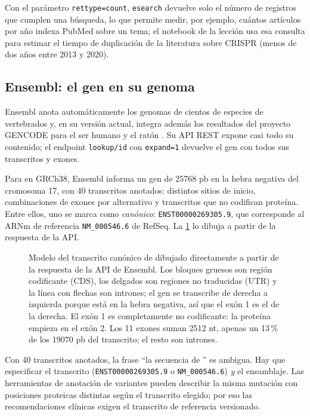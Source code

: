 Con el parámetro \texttt{rettype=count}, \texttt{esearch} devuelve solo el número de registros que cumplen una búsqueda, lo que permite medir, por ejemplo, cuántos artículos por año indexa PubMed sobre un tema; el notebook de la lección usa esa consulta para estimar el tiempo de duplicación de la literatura sobre CRISPR (menos de dos años entre 2013 y 2020).

\subsection{Ensembl: el gen en su genoma}

Ensembl anota automáticamente los genomas de cientos de especies de vertebrados y, en su versión actual, integra además los resultados del proyecto GENCODE para el ser humano y el ratón \parencite{c02-dyer2025}. Su API REST \parencite{c02-yates2015} expone casi todo su contenido; el endpoint \texttt{lookup/id} con \texttt{expand=1} devuelve el gen con todos sus transcritos y exones.

Para  en GRCh38, Ensembl informa un gen de \num{25768} pb en la hebra negativa del cromosoma 17, con 40 transcritos anotados: distintos sitios de inicio, combinaciones de exones por  alternativo y transcritos que no codifican proteína. Entre ellos, uno se marca como \emph{canónico}: \texttt{ENST00000269305.9}, que corresponde al ARNm de referencia \texttt{NM\_000546.6} de RefSeq. La \cref{fig:02-tp53} lo dibuja a partir de la respuesta de la API.

\begin{figure}[t]
\centering

\caption[El transcrito canónico de ]{Modelo del transcrito canónico de  dibujado directamente a partir de la respuesta de la API de Ensembl. Los bloques gruesos son región codificante (CDS), los delgados son regiones no traducidas (UTR) y la línea con flechas son intrones; el gen se transcribe de derecha a izquierda porque está en la hebra negativa, así que el exón 1 es el de la derecha. El exón 1 es completamente no codificante: la proteína empieza en el exón 2. Los 11 exones suman \num{2512} nt, apenas un 13\,\% de los \num{19070} pb del transcrito; el resto son intrones.}
\label{fig:02-tp53}
\end{figure}

\begin{cuidado}
Con 40 transcritos anotados, la frase ``la secuencia de '' es ambigua. Hay que especificar el transcrito (\texttt{ENST00000269305.9} o \texttt{NM\_000546.6}) \emph{y} el ensamblaje. Las herramientas de anotación de variantes pueden describir la misma mutación con posiciones proteicas distintas según el transcrito elegido; por eso las recomendaciones clínicas exigen el transcrito de referencia versionado.
\end{cuidado}

